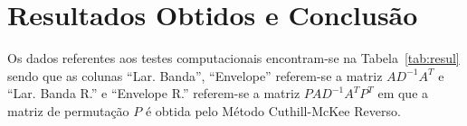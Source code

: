 \section{Resultados Obtidos e Conclusão}
Os dados referentes aos testes computacionais encontram-se na
Tabela~\ref{tab:resul} sendo que as colunas ``Lar. Banda'', ``Envelope''
referem-se a matriz $A D^{-1} A^T$ e ``Lar. Banda R.'' e ``Envelope R.''
referem-se a matriz $P A D^{-1} A^T P^T$ em que a matriz de permutação $P$ é
obtida pelo Método Cuthill-McKee Reverso.
